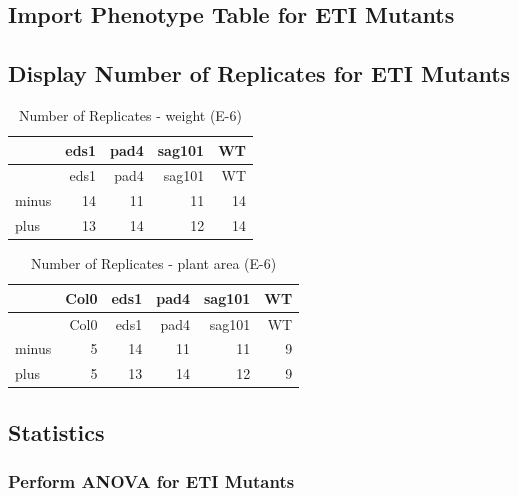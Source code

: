 \documentclass[
  10pt,
]{article}
\begin{document}
\subsection{Import Phenotype Table for ETI
Mutants}\label{import-phenotype-table-for-eti-mutants}

\subsection{Display Number of Replicates for ETI
Mutants}\label{display-number-of-replicates-for-eti-mutants}

\begin{longtable}[]{@{}lrrrr@{}}
\caption{Number of Replicates - weight (E-6)}\tabularnewline
\toprule\noalign{}
& eds1 & pad4 & sag101 & WT \\
\midrule\noalign{}
\endfirsthead
\toprule\noalign{}
& eds1 & pad4 & sag101 & WT \\
\midrule\noalign{}
\endhead
\bottomrule\noalign{}
\endlastfoot
minus & 14 & 11 & 11 & 14 \\
plus & 13 & 14 & 12 & 14 \\
\end{longtable}

\begin{longtable}[]{@{}lrrrrr@{}}
\caption{Number of Replicates - plant area (E-6)}\tabularnewline
\toprule\noalign{}
& Col0 & eds1 & pad4 & sag101 & WT \\
\midrule\noalign{}
\endfirsthead
\toprule\noalign{}
& Col0 & eds1 & pad4 & sag101 & WT \\
\midrule\noalign{}
\endhead
\bottomrule\noalign{}
\endlastfoot
minus & 5 & 14 & 11 & 11 & 9 \\
plus & 5 & 13 & 14 & 12 & 9 \\
\end{longtable}

\newpage

\subsection{Statistics}\label{statistics-4}

\subsubsection{Perform ANOVA for ETI
Mutants}\label{perform-anova-for-eti-mutants}
\end{document}
